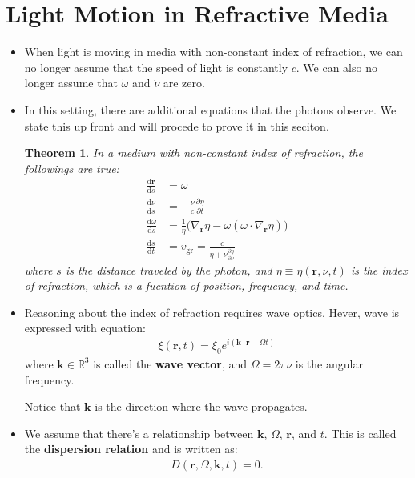 \documentclass[10pt]{article}
\newtheorem{theorem}[lemma]{Theorem}
\newcommand{\dee}{\mathrm{d}}
\newcommand{\ve}[1]{\mathbf{#1}}
\newcommand{\group}{\mathrm{gr}}
\begin{document}
  \section{Light Motion in Refractive Media}
  \begin{itemize}
    \item When light is moving in media with non-constant index of refraction, we can no longer assume that the speed of light is constantly $c$. We can also no longer assume that $\dot \omega$ and $\dot \nu$ are zero.

    \item In this setting, there are additional equations that the photons observe. We state this up front and will procede to prove it in this seciton.
    \begin{theorem} \label{light-in-refractive-media}
      In a medium with non-constant index of refraction, the followings are true:
      \begin{align}
        \frac{\dee \ve{r}}{\dee s} &= \omega \label{light-position-deriv}\\
        \frac{\dee \nu}{\dee s} &= -\frac{\nu}{c} \frac{\partial \eta}{\partial t} \label{light-frequency-deriv}\\
        \frac{\dee \omega}{\dee s} &= \frac{1}{\eta} \big( \nabla_{\ve{r}}\eta - \omega(\omega \cdot \nabla_{\ve{r}}\eta)\big) \label{light-direction-deriv}\\
        \frac{\dee s}{\dee t} &= v_\group = \frac{c}{\eta + \nu \frac{\partial \eta}{\partial \nu}} \label{light-distance-deriv}
      \end{align}
      where $s$ is the distance traveled by the photon, and $\eta \equiv \eta(\ve{r}, \nu, t)$ is the index of refraction, which is a fucntion of position, frequency, and time.
    \end{theorem}    
    
    \item Reasoning about the index of refraction requires wave optics. Hever, wave is expressed with equation:
    \begin{align*}
      \xi(\ve{r}, t) = \xi_0 e^{i(\ve{k} \cdot \ve{r} - \Omega t)}
    \end{align*}
    where $\ve{k} \in \mathbb{R}^3$ is called the \textbf{wave vector}, and $\Omega = 2\pi \nu$ is the angular frequency.

    Notice that $\ve{k}$ is the direction where the wave propagates.

    \item We assume that there's a relationship between $\ve{k}$, $\Omega$, $\ve{r}$, and $t$. This is called the \textbf{dispersion relation} and is written as:
    \begin{align*}
      D(\ve{r}, \Omega, \ve{k}, t) = 0.
    \end{align*}


\end{itemize}
\end{document}
